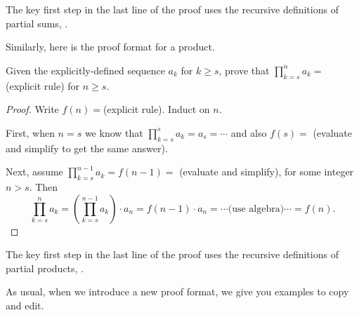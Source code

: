 The key first step in the last line of the proof uses the recursive definitions of partial sums, .

Similarly, here is the proof format for a product.

\begin{pff}
\label{pff_math_ind_prod}
    Given the explicitly-defined sequence $a_k$ for $k \ge s$, prove that $\displaystyle \prod_{k=s}^na_k=$ (explicit rule) for $n \ge s$.
    \begin{proof}
        Write $f(n) = $(explicit rule).  Induct on $n$.

        First, when $n=s$ we know that $\displaystyle \prod_{k=s}^sa_k=a_s= \cdots $ and also $f(s)=$ (evaluate and simplify to get the same answer).

        Next, assume $\displaystyle \prod_{k=s}^{n-1}a_k=f(n-1)= $ (evaluate and simplify), for some integer $n > s$.  Then 
            $$ \prod_{k=s}^na_k 
            = \left(\prod_{k=s}^{n-1}a_k\right) \cdot a_n
            = f(n-1) \cdot a_n 
            = \cdots \text{(use algebra)} \cdots 
            = f(n).$$
    \end{proof}
\end{pff}

The key first step in the last line of the proof uses the recursive definitions of partial products, .

As usual, when we introduce a new proof format, we give you examples to copy and edit.

